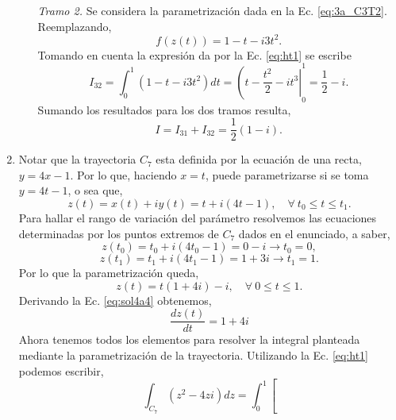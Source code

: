 \documentclass[10pt,a4paper]{article}
\begin{document}
\begin{enumerate}
\begin{enumerate}
\begin{profesor}
	\textit{Tramo 2.} Se considera la parametrizaci\'on dada en la Ec. \ref{eq:3a_C3T2}.
	Reemplazando,
	\begin{equation}
	f(z(t)) = 1-t-i3t^2.
	\end{equation}
	Tomando en cuenta la expresi\'on da por la Ec. \ref{eq:ht1} se escribe
	\begin{equation}
	I_{32} = \int_0^1 (1-t-i3t^2)dt = \left(t-\dfrac{t^2}{2}-it^3\right|_0^1 = 
	\dfrac{1}{2}-i.
	\end{equation}
	Sumando los resultados para los dos tramos resulta,
	\begin{equation}
	I=I_{31}+I_{32}=\boxed{\frac{1}{2}(1-i)}.
	\end{equation}
\end{profesor}
	
\end{enumerate}
\item  
	Notar que la trayectoria $C_7$ esta definida por la ecuaci\'on de una 
	recta, $y=4x-1$. Por lo que, haciendo $x=t$, puede parametrizarse si se 
	toma $y=4t-1$, o sea que,
	\begin{equation}
	z(t)=x(t)+iy(t)=t+i(4t-1), \quad \forall ~ t_0 \leq t \leq t_1.
	\label{eq:sol4a1}
	\end{equation}	
	Para hallar el rango de variaci\'on del par\'ametro resolvemos las 
	ecuaciones determinadas por los puntos extremos de $C_7$ dados en el 
	enunciado, a saber,
	\begin{equation}
	z(t_0)=t_0+i(4t_0-1)=0-i \rightarrow t_0=0,
	\label{eq:sol4a2}
	\end{equation}	
	\begin{equation}
	z(t_1)=t_1+i(4t_1-1)=1+3i \rightarrow t_1=1.
	\label{eq:sol4a3}
	\end{equation}	
	Por lo que la parametrizaci\'on queda,
	\begin{equation}
	z(t)=t(1+4i)-i, \quad \forall ~ 0 \leq t \leq 1.
	\label{eq:sol4a4}
	\end{equation}
	Derivando la Ec. \ref{eq:sol4a4} obtenemos,
	\begin{equation}
	 \frac{dz(t)}{dt} =1+4i
	\label{eq:sol4a5}
	\end{equation}
	Ahora tenemos todos los elementos para resolver la integral planteada 
	mediante la parametrizaci\'on de la trayectoria. Utilizando la Ec. 
	\ref{eq:ht1} podemos escribir,
	\begin{equation}
	\int_{C_7}^{}(z^2-4zi) dz=\int_{0}^{1}\left[ 

\end{equation}
\end{enumerate}
\end{document}

